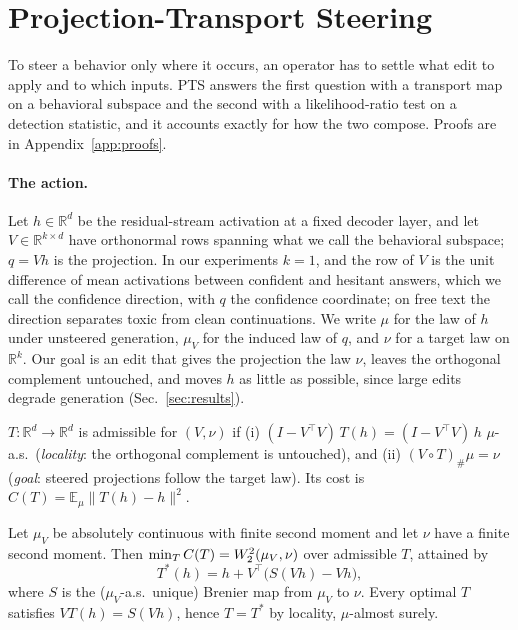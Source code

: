 \section{Projection-Transport Steering}
\label{sec:method}

To steer a behavior only where it occurs, an operator has to settle what edit
to apply and to which inputs. PTS answers the first question with a transport
map on a behavioral subspace and the second with a likelihood-ratio test on a
detection statistic, and it accounts exactly for how the two compose. Proofs
are in Appendix~\ref{app:proofs}.

\paragraph{The action.} Let $h\in\mathbb{R}^d$ be the residual-stream activation
at a fixed decoder layer, and let $V\in\mathbb{R}^{k\times d}$ have orthonormal
rows spanning what we call the behavioral subspace; $q=Vh$ is the projection.
In our experiments $k=1$, and the row of $V$ is the unit difference of mean
activations between confident and hesitant answers, which we call the
confidence direction, with $q$ the confidence coordinate; on free text the
direction separates toxic from clean continuations. We write $\mu$ for the law
of $h$ under unsteered generation, $\mu_V$ for the induced law of $q$, and
$\nu$ for a target law on $\mathbb{R}^k$. Our goal is an edit that gives the
projection the law $\nu$, leaves the orthogonal complement untouched, and
moves $h$ as little as possible, since large edits degrade generation
(Sec.~\ref{sec:results}).

\begin{definition}
\label{def:local}
$T:\mathbb{R}^d\to\mathbb{R}^d$ is admissible for $(V,\nu)$ if
(i) $(I-V^\top V)\,T(h)=(I-V^\top V)\,h$ $\mu$-a.s.\ (\emph{locality}: the
orthogonal complement is untouched), and (ii) $(V\!\circ T)_{\#}\mu=\nu$
(\emph{goal}: steered projections follow the target law). Its cost is
$C(T)=\mathbb{E}_\mu\lVert T(h)-h\rVert^2$.
\end{definition}

\begin{theorem}
\label{thm:ot}
Let $\mu_V$ be absolutely continuous with finite second moment and let $\nu$
have a finite second moment. Then $\min_T C(T)=W_2^2(\mu_V,\nu)$ over
admissible $T$, attained by
\begin{equation}
T^*(h)=h+V^\top\big(S(Vh)-Vh\big),
\label{eq:edit}
\end{equation}
where $S$ is the ($\mu_V$-a.s.\ unique) Brenier map from $\mu_V$ to $\nu$.
Every optimal $T$ satisfies $VT(h)=S(Vh)$, hence $T=T^*$ by locality,
$\mu$-almost surely.
\end{theorem}

